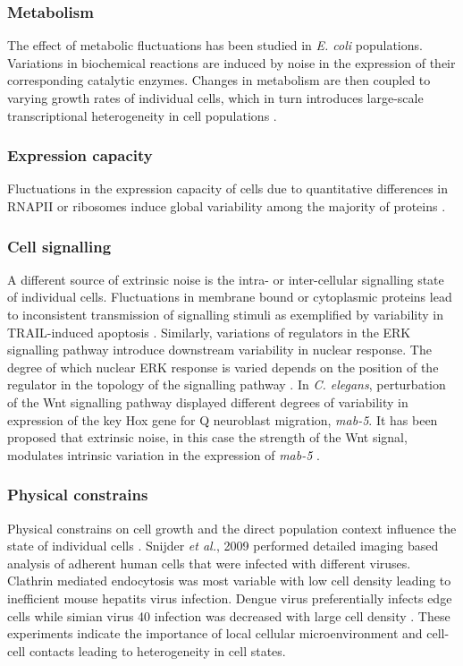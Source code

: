 \subsubsection{Metabolism}

The effect of metabolic fluctuations has been studied in \textit{E. coli} populations. Variations in biochemical reactions are induced by noise in the expression of their corresponding catalytic enzymes. Changes in metabolism are then coupled to varying growth rates of individual cells, which in turn introduces large-scale transcriptional heterogeneity in cell populations \citep{Kiviet2014}.  

\subsubsection{Expression capacity}

Fluctuations in the expression capacity of cells due to quantitative differences in RNAPII or ribosomes induce global variability among the majority of proteins \citep{Colman-Lerner2005a}.

\subsubsection{Cell signalling}

A different source of extrinsic noise is the intra- or inter-cellular signalling state of individual cells. Fluctuations in membrane bound or cytoplasmic proteins lead to inconsistent transmission of signalling stimuli as exemplified by variability in TRAIL-induced apoptosis \citep{Spencer2009}. Similarly, variations of regulators in the \gls{ERK} signalling pathway introduce downstream variability in nuclear response. The degree of which nuclear ERK response is varied depends on the position of the regulator in the topology of the signalling pathway \citep{Iwamoto2016}. In \textit{C. elegans}, perturbation of the Wnt signalling pathway displayed different degrees of variability in expression of the key Hox gene for Q neuroblast migration, \textit{mab-5}. It has been proposed that extrinsic noise, in this case the strength of the Wnt signal, modulates intrinsic variation in the expression of \textit{mab-5} \citep{Ji2013}. 

\subsubsection{Physical constrains}

Physical constrains on cell growth and the direct population context influence the state of individual cells \citep{Battich2015a}. Snijder \textit{et al.}, 2009 performed detailed imaging based analysis of adherent human cells that were infected with different viruses. Clathrin mediated endocytosis was most variable with low cell density leading to inefficient mouse hepatits virus infection. Dengue virus preferentially infects edge cells while simian virus 40 infection was decreased with large cell density \citep{Snijder2009}. These experiments indicate the importance of local cellular microenvironment and cell-cell contacts leading to heterogeneity in cell states. 

